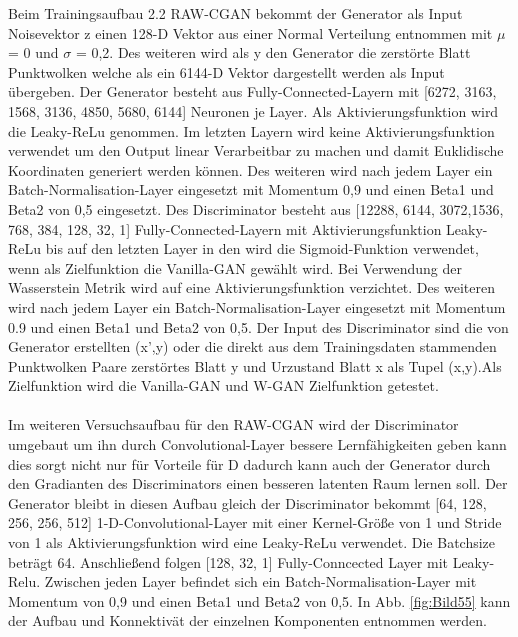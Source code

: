 \documentclass{llncs}
\begin{document}
Beim Trainingsaufbau 2.2 RAW-CGAN bekommt der Generator als Input Noisevektor z einen 128-D Vektor aus einer  Normal Verteilung entnommen mit $\mu$ =  0 und $\sigma$ =  0,2. Des weiteren wird als y den Generator die  zerstörte Blatt Punktwolken welche als ein 6144-D Vektor dargestellt werden als Input übergeben. Der Generator besteht aus Fully-Connected-Layern mit [6272, 3163, 1568, 3136, 4850, 5680, 6144] Neuronen je Layer. Als Aktivierungsfunktion wird die Leaky-ReLu genommen. Im letzten Layern wird keine Aktivierungsfunktion verwendet um den Output linear Verarbeitbar zu machen und damit Euklidische Koordinaten generiert werden können. Des weiteren wird nach jedem Layer ein Batch-Normalisation-Layer eingesetzt mit Momentum 0,9 und einen Beta1 und Beta2 von 0,5 eingesetzt. Des Discriminator besteht aus [12288, 6144, 3072,1536, 768, 384, 128, 32, 1] Fully-Connected-Layern mit Aktivierungsfunktion Leaky-ReLu bis auf den letzten Layer in den wird die Sigmoid-Funktion verwendet, wenn als Zielfunktion die Vanilla-GAN gewählt wird. Bei Verwendung der Wasserstein Metrik wird auf eine Aktivierungsfunktion verzichtet. Des weiteren wird nach jedem Layer ein Batch-Normalisation-Layer eingesetzt mit Momentum 0.9 und einen Beta1 und Beta2 von 0,5. Der Input des Discriminator sind die von Generator erstellten (x',y) oder die direkt aus dem Trainingsdaten stammenden Punktwolken Paare zerstörtes Blatt y und Urzustand Blatt x als Tupel (x,y).Als Zielfunktion wird die Vanilla-GAN und W-GAN Zielfunktion getestet.
\\\\
Im weiteren Versuchsaufbau für den RAW-CGAN wird der Discriminator umgebaut um ihn durch Convolutional-Layer bessere Lernfähigkeiten geben kann dies sorgt nicht nur für Vorteile für D dadurch kann auch der Generator durch den Gradianten des Discriminators einen besseren latenten Raum lernen soll. Der Generator bleibt in diesen Aufbau gleich der Discriminator bekommt [64, 128, 256, 256, 512] 1-D-Convolutional-Layer mit einer Kernel-Größe von 1 und Stride von 1 als Aktivierungsfunktion wird eine Leaky-ReLu verwendet. Die Batchsize beträgt 64. Anschließend folgen [128, 32, 1] Fully-Conncected Layer mit Leaky-Relu. Zwischen jeden Layer befindet sich ein Batch-Normalisation-Layer mit Momentum von 0,9 und einen Beta1 und Beta2 von 0,5. In Abb. \ref{fig:Bild55} kann der Aufbau und Konnektivät der einzelnen Komponenten entnommen werden.
\end{document}

